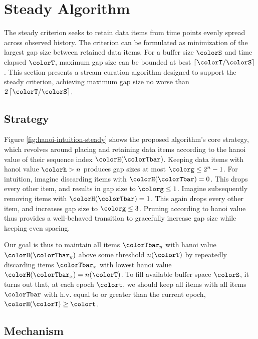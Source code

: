 \section{Steady Algorithm} \label{sec:steady}

The steady criterion seeks to retain data items from time points evenly spread across observed history.
The criterion can be formulated as minimization of the largest gap size between retained data items.
For a buffer size $\colorS$ and time elapsed $\colorT$, maximum gap size can be bounded at best $\left\lceil \colorT / \colorS \right\rceil$.
This section presents a stream curation algorithm designed to support the steady criterion, achieving maximum gap size no worse than $2\left\lceil \colorT / \colorS \right\rceil$.

\subsection{Strategy}

Figure \ref{fig:hanoi-intuition-steady} shows the proposed algorithm's core strategy, which revolves around placing and retaining data items according to the hanoi value of their sequence index $\colorH(\colorTbar)$.
Keeping data items with hanoi value $\colorh > n$ produces gap sizes at most $\colorg \leq 2^n - 1$.
For intuition, imagine discarding items with $\colorH(\colorTbar) = 0$.
This drops every other item, and results in gap size to $\colorg \leq 1$.
Imagine subsequently removing items with $\colorH(\colorTbar) = 1$.
This again drops every other item, and increases gap size to $\colorg \leq 3$.
Pruning according to hanoi value thus provides a well-behaved transition to gracefully increase gap size while keeping even spacing.

Our goal is thus to maintain all items $\colorTbar_y$ with hanoi value $\colorH(\colorTbar_y)$ above some threshold $n(\colorT)$ by repeatedly discarding items $\colorTbar_x$ with lowest hanoi value $\colorH(\colorTbar_x) = n(\colorT)$.
To fill available buffer space $\colorS$, it turns out that, at each epoch $\colort$, we should keep all items with all items $\colorTbar$ with h.v. equal to or greater than the current epoch, $\colorH(\colorT) \geq \colort$.



\subsection{Mechanism}

